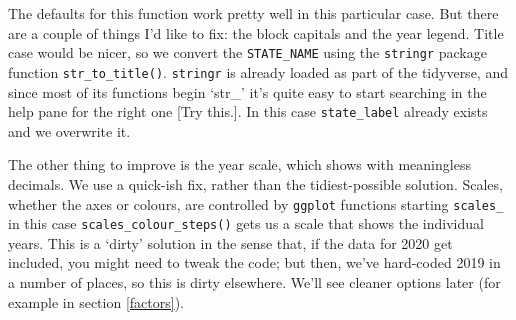 \documentclass[
]{book}
\begin{document}
The defaults for this function work pretty well in this particular case. But there are a couple of things I'd like to fix: the block capitals and the year legend. Title case would be nicer, so we convert the \texttt{STATE\_NAME} using the \texttt{stringr} package function \texttt{str\_to\_title()}. \texttt{stringr} is already loaded as part of the tidyverse, and since most of its functions begin `str\_' it's quite easy to start searching in the help pane for the right one {[}Try this.{]}. In this case \texttt{state\_label} already exists and we overwrite it.

The other thing to improve is the year scale, which shows with meaningless decimals. We use a quick-ish fix, rather than the tidiest-possible solution. Scales, whether the axes or colours, are controlled by \texttt{ggplot} functions starting \texttt{scales\_} in this case \texttt{scales\_colour\_steps()} gets us a scale that shows the individual years. This is a `dirty' solution in the sense that, if the data for 2020 get included, you might need to tweak the code; but then, we've hard-coded 2019 in a number of places, so this is dirty elsewhere. We'll see cleaner options later (for example in section \ref{factors}).
\end{document}
